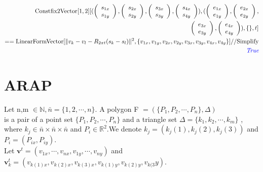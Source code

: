 \documentclass[8pt]{article}
\begin{document}
\begin{screen}
\begin{eqnarray*}
\end{eqnarray*}
\begin{eqnarray*}
\text{Constfix2Vector}[1,2][(\left(\begin{array}{c}
s_{1x}\\
s_{1y}\\
\end{array}\right),\left(\begin{array}{c}
s_{2x}\\
s_{2y}\\
\end{array}\right),\left(\begin{array}{c}
s_{3x}\\
s_{3y}\\
\end{array}\right),\left(\begin{array}{c}
s_{4x}\\
s_{4y}\\
\end{array}\right)),(\left(\begin{array}{c}
e_{1x}\\
e_{1y}\\
\end{array}\right),\left(\begin{array}{c}
e_{2x}\\
e_{2y}\\
\end{array}\right),\\
\left(\begin{array}{c}
e_{3x}\\
e_{3y}\\
\end{array}\right),\left(\begin{array}{c}
e_{4x}\\
e_{4y}\\
\end{array}\right)), \{\}, t]\\
==\text{LinearFormVector}[\|v_k - v_l - R_{2\pi t}(s_k - s_l)\|^2,\{v_{1x},v_{1y},v_{2x},v_{2y},v_{3x},v_{3y},v_{4x},v_{4y}\}]
//\text{Simplify}\\
\text{\it \color{blue}True}\\
\end{eqnarray*}
\end{screen}
\section{ARAP}

Let n,m $ \in \mathbb{N} ,\bar{n} = \{ 1,2, \cdots ,n \}.$ A polygon F $ = ( \{P_1,P_2, \cdots ,P_n\}, \Delta  ) $ \\
is a pair of a point set  $\{ P_1,P_2, \cdots ,P_n\}$ and a triangle set $ \Delta = \{ k_1,k_2, \cdots ,k_m\} $ ,\\
where $ k_j \in \bar{n} \times \bar{n} \times\bar{n}$ and $ P_i \in \mathbb{R}^2$.We denote $k_j = (k_j(1),k_j(2),k_j(3))$  and  $P_i = (P_{ix},P_{iy}).$\\
Let $\mathbf{v}^t = (v_{1x}, \cdots ,v_{nx},v_{1y}, \cdots ,v_{ny})$ and $\mathbf{v}_k^t = (v_{k(1)x},v_{k(2)x},v_{k(3)x},v_{k(1)y},v_{k(2)y},v_{k(3}y)$. \\
\end{document}
